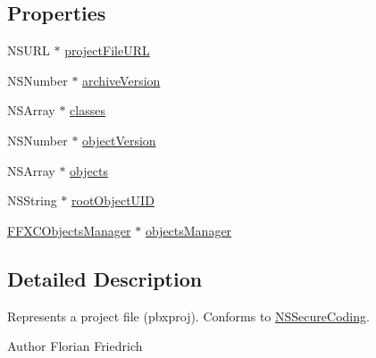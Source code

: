 \subsection*{Properties}
\begin{DoxyCompactItemize}
\item 
N\-S\-U\-R\-L $\ast$ \hyperlink{interface_f_f_x_c_project_file_aa3dfcf55b91beaf8e8d1e9f4d96fafac}{project\-File\-U\-R\-L}
\item 
N\-S\-Number $\ast$ \hyperlink{interface_f_f_x_c_project_file_a818588557d0a69a9fdf8841226927ede}{archive\-Version}
\item 
N\-S\-Array $\ast$ \hyperlink{interface_f_f_x_c_project_file_a96ddee82bd96e6aedcabb1b5525d271a}{classes}
\item 
N\-S\-Number $\ast$ \hyperlink{interface_f_f_x_c_project_file_acb8076d99d591d96ebcfc054f245502e}{object\-Version}
\item 
N\-S\-Array $\ast$ \hyperlink{interface_f_f_x_c_project_file_a33fea1547ee2353ca544f62044b2f27a}{objects}
\item 
N\-S\-String $\ast$ \hyperlink{interface_f_f_x_c_project_file_a39be39e55e3a695fcc9882ec72e53990}{root\-Object\-U\-I\-D}
\item 
\hyperlink{interface_f_f_x_c_objects_manager}{F\-F\-X\-C\-Objects\-Manager} $\ast$ \hyperlink{interface_f_f_x_c_project_file_ad348c3a1195a98462e17c22c66d89eda}{objects\-Manager}
\end{DoxyCompactItemize}


\subsection{Detailed Description}
Represents a project file (pbxproj). Conforms to \hyperlink{class_n_s_secure_coding-p}{N\-S\-Secure\-Coding}. \begin{DoxyAuthor}{Author}
Florian Friedrich 
\end{DoxyAuthor}


